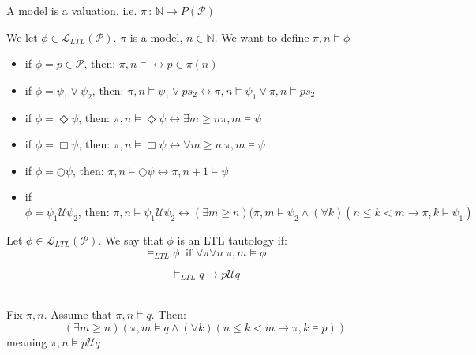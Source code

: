     {
        A model is a valuation, i.e.  $\pi \,:\,\mathbb{N} \longrightarrow P(\mathcal{P}) $

    }
    \nt
    {
        We let $\phi \in \mathcal{L}_{LTL}(\mathcal{P})$. $\pi$ is a model, $n \in \mathbb{N}$. We want to define $\pi, n \vDash \phi$

        \begin{itemize}
            \item if $\phi = p \in \mathcal{P} \text{, then:  } \pi, n \vDash \leftrightarrow p \in \pi(n)$
            \item if $ \phi = \psi_1 \vee \psi_2 \text{, then:  }  \pi,n \vDash \psi_1 \vee  ps_2 \leftrightarrow  \pi,n \vDash \psi_1 \vee \pi,n \vDash ps_2$
            \item if $ \phi = \Diamond \psi \text{, then:  } \pi,n \vDash \Diamond \psi \leftrightarrow \exists  m \ge n  \pi,m \vDash \psi $
            \item if $\phi = \Box \psi \text{, then:  } \pi,n \vDash \Box \psi \leftrightarrow \forall m \ge n\: \pi, m \vDash \psi $ 
            \item if $\phi = \bigcirc \psi \text{, then:  } \pi,n \vDash \bigcirc \psi \leftrightarrow  \pi, n+1 \vDash \psi$ 
            \item if $ \phi = \psi_1 \mathcal{U} \psi_2 \text{, then:  } \pi, n \vDash \psi_1 \mathcal{U} \psi_2 \leftrightarrow  (\exists m \ge n )(\pi,m \vDash  \psi_2 \wedge (\forall k )(n \le k < m \rightarrow  \pi, k \vDash \psi_1)$
        \end{itemize}
    }


    {
        Let $\phi \in \mathcal{L}_{LTL}(\mathcal{P})$. We say that $\phi$ is an LTL tautology if:
        \begin{equation}
             \vDash_{LTL} \phi \: \text{ if } \forall \pi \forall n \: \pi,m \vDash \phi
        \end{equation}
    }

    {
        \begin{equation}
            \vDash_{LTL} q \rightarrow p \mathcal{U} q
        \end{equation}
        \\

        \begin{myproof}
            Fix $\pi, n$. Assume that $\pi, n \vDash q$. Then:
            \begin{equation}
                ( \exists m \ge n ) (\pi,m \vDash q \wedge (\forall k)(n \le k < m \rightarrow \pi, k \vDash p) )
            \end{equation}
            meaning $\pi, n \vDash p \mathcal{U} q$
        \end{myproof}
    }

